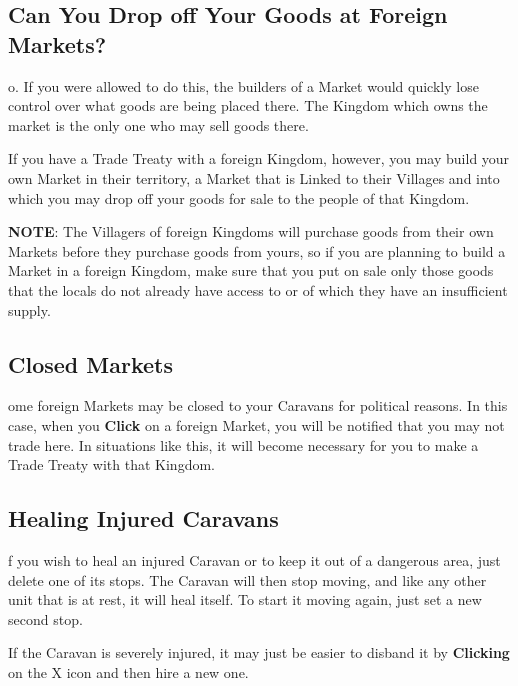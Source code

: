 \subsection{Can You Drop off Your Goods at Foreign Markets?}


o. If you were allowed to do this, the builders of a Market would quickly lose control over what goods are being placed there. The Kingdom which owns the market is the only one who may sell goods there.

If you have a Trade Treaty with a foreign Kingdom, however, you may build your own Market in their territory, a Market that is Linked to their Villages and into which you may drop off your goods for sale to the people of that Kingdom.

\textbf{NOTE}: The Villagers of foreign Kingdoms will purchase goods from their own Markets before they purchase goods from yours, so if you are planning to build a Market in a foreign Kingdom, make sure that you put on sale only those goods that the locals do not already have access to or of which they have an insufficient supply.

\subsection{Closed Markets}


ome foreign Markets may be closed to your Caravans for political reasons. In this case, when you \textbf{Click} on a foreign Market, you will be notified that you may not trade here. In situations like this, it will become necessary for you to make a Trade Treaty with that Kingdom.

\subsection{Healing Injured Caravans}


f you wish to heal an injured Caravan or to keep it out of a dangerous area, just delete one of its stops. The Caravan will then stop moving, and like any other unit that is at rest, it will heal itself. To start it moving again, just set a new second stop.


If the Caravan is severely injured, it may just be easier to disband it by \textbf{Clicking} on the X icon and then hire a new one.

